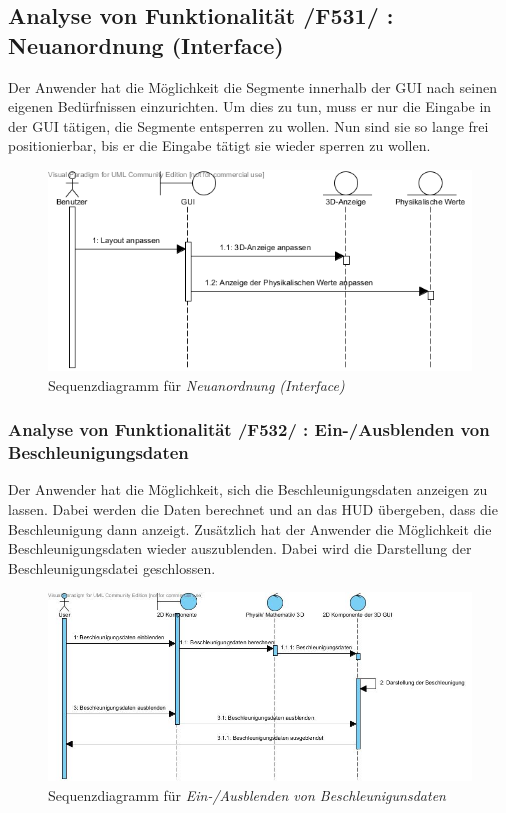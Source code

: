 \subsection{Analyse von Funktionalität /F531/ :   Neuanordnung (Interface)}
Der Anwender hat die Möglichkeit die Segmente innerhalb der GUI nach seinen eigenen Bedürfnissen einzurichten. Um dies zu tun, muss er nur die Eingabe in der GUI tätigen, die Segmente entsperren zu wollen.
Nun sind sie so lange frei positionierbar, bis er die Eingabe tätigt sie wieder sperren zu wollen.
\begin{figure}
\includegraphics[width=16cm]{bilder/Interface_Neuanordnung}
\caption{Sequenzdiagramm für \textit{Neuanordnung (Interface)}}
\label{labelname}
\end{figure}
\subsubsection{Analyse von Funktionalität /F532/ :  Ein-/Ausblenden von Beschleunigungsdaten}
Der Anwender hat die Möglichkeit, sich die Beschleunigungsdaten anzeigen zu lassen. Dabei werden die Daten berechnet und an das HUD übergeben, dass die Beschleunigung dann anzeigt. Zusätzlich hat der Anwender die Möglichkeit die Beschleunigungsdaten wieder auszublenden. Dabei wird die Darstellung der Beschleunigungsdatei geschlossen.
\begin{figure}
\includegraphics[width=16cm]{bilder/Simulator_Beschleunigung}
\caption{Sequenzdiagramm für \textit{Ein-/Ausblenden von Beschleunigunsdaten}}
\label{labelname}
\end{figure}
